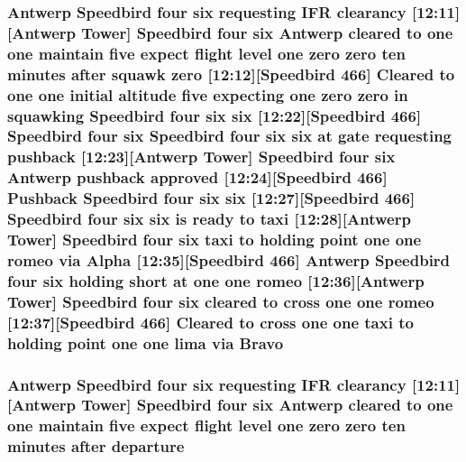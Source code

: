 \subsubsection[{\texorpdfstring{Bravo}{Bravo}}]{\setlength{\rightskip}{0pt plus 5cm}Antwerp Speedbird four {\bf six} requesting I\+FR clearancy \mbox{[}12\+:11\mbox{]}\mbox{[}Antwerp {\bf Tower}\mbox{]} Speedbird four {\bf six} Antwerp cleared to {\bf one} {\bf one} maintain five expect flight level {\bf one} {\bf zero} {\bf zero} {\bf ten} minutes after squawk {\bf zero} \mbox{[}12\+:12\mbox{]}\mbox{[}Speedbird 466\mbox{]} Cleared to {\bf one} {\bf one} initial altitude five expecting {\bf one} {\bf zero} {\bf zero} in {\bf squawking} Speedbird four {\bf six} {\bf six} \mbox{[}12\+:22\mbox{]}\mbox{[}Speedbird 466\mbox{]} Speedbird four {\bf six} Speedbird four {\bf six} {\bf six} at gate requesting pushback \mbox{[}12\+:23\mbox{]}\mbox{[}Antwerp {\bf Tower}\mbox{]} Speedbird four {\bf six} Antwerp pushback {\bf approved} \mbox{[}12\+:24\mbox{]}\mbox{[}Speedbird 466\mbox{]} Pushback Speedbird four {\bf six} {\bf six} \mbox{[}12\+:27\mbox{]}\mbox{[}Speedbird 466\mbox{]} Speedbird four {\bf six} {\bf six} is ready to taxi \mbox{[}12\+:28\mbox{]}\mbox{[}Antwerp {\bf Tower}\mbox{]} Speedbird four {\bf six} taxi to holding point {\bf one} {\bf one} {\bf romeo} via {\bf Alpha} \mbox{[}12\+:35\mbox{]}\mbox{[}Speedbird 466\mbox{]} Antwerp Speedbird four {\bf six} holding short at {\bf one} {\bf one} {\bf romeo} \mbox{[}12\+:36\mbox{]}\mbox{[}Antwerp {\bf Tower}\mbox{]} Speedbird four {\bf six} cleared to cross {\bf one} {\bf one} {\bf romeo} \mbox{[}12\+:37\mbox{]}\mbox{[}Speedbird 466\mbox{]} Cleared to cross {\bf one} {\bf one} taxi to holding point {\bf one} {\bf one} {\bf lima} via Bravo}\hypertarget{happyDay4ATC_8txt_ace27fd0bdc1b0da536a70f89116c159c}{}\label{happyDay4ATC_8txt_ace27fd0bdc1b0da536a70f89116c159c}
\subsubsection[{\texorpdfstring{departure}{departure}}]{\setlength{\rightskip}{0pt plus 5cm}Antwerp Speedbird four {\bf six} requesting I\+FR clearancy \mbox{[}12\+:11\mbox{]}\mbox{[}Antwerp {\bf Tower}\mbox{]} Speedbird four {\bf six} Antwerp cleared to {\bf one} {\bf one} maintain five expect flight level {\bf one} {\bf zero} {\bf zero} {\bf ten} minutes after departure}\hypertarget{happyDay4ATC_8txt_af9835824e50bb6ca59bed75129f137e3}{}\label{happyDay4ATC_8txt_af9835824e50bb6ca59bed75129f137e3}
